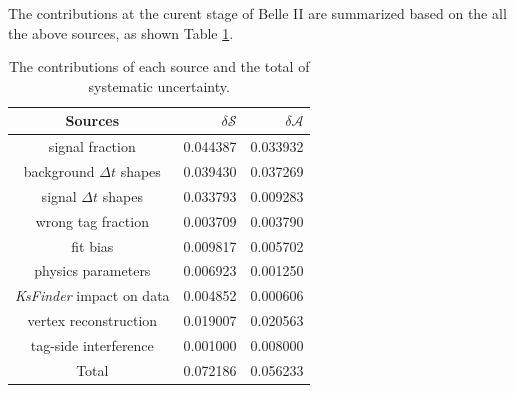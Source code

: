 The contributions at the curent stage of Belle II are summarized based on the all the above sources, as shown Table \ref{tab:sy_sub}. 

\begin{table}
	\centering
		\caption{The contributions of each source and the total of systematic uncertainty.  }
	\label{tab:sy_sub}
	\begin{tabular}{c|r|r} 
		\hline
		Sources &  $\delta \mathcal{S}$ & $\delta \mathcal{A}$\\
		\hline
		signal fraction  & 0.044387 & 0.033932 \\
		background $\Delta t$ shapes & 0.039430 & 0.037269\\
		signal $\Delta t$ shapes & 0.033793 & 0.009283 \\
		wrong tag fraction & 0.003709 & 0.003790\\
		fit bias & 0.009817 & 0.005702 \\
		physics parameters & 0.006923 & 0.001250\\ 
		\textit{KsFinder} impact on data & 0.004852 & 0.000606\\
		vertex reconstruction & 0.019007 & 0.020563\\
		tag-side interference & 0.001000 & 0.008000\\
		\hline
		Total & 0.072186 & 0.056233\\
		\hline
	\end{tabular}

\end{table}
